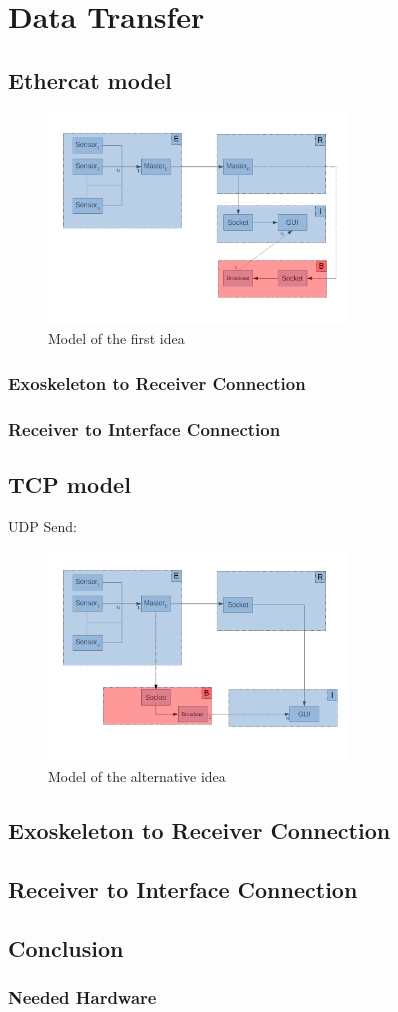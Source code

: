 \section{Data Transfer}
\subsection{Ethercat model}
\begin{figure}[H]
	\centering
	\includegraphics[width=300px]{ERBI-Model-EtherCat}
	\caption{Model of the first idea}
	\label{img:orgidea}
\end{figure}

\subsubsection{Exoskeleton to Receiver Connection}
\subsubsection{Receiver to Interface Connection}


\subsection{TCP model}
UDP Send: \cite{web:UDPSend}
\begin{figure}[H]
	\centering
	\includegraphics[width=300px]{ERBI-Model-TCP}
	\caption{Model of the alternative idea}
	\label{img:altidea}
\end{figure}
	
\subsection{Exoskeleton to Receiver Connection}
\subsection{Receiver to Interface Connection}	


\subsection{Conclusion}
\subsubsection{Needed Hardware}
% 